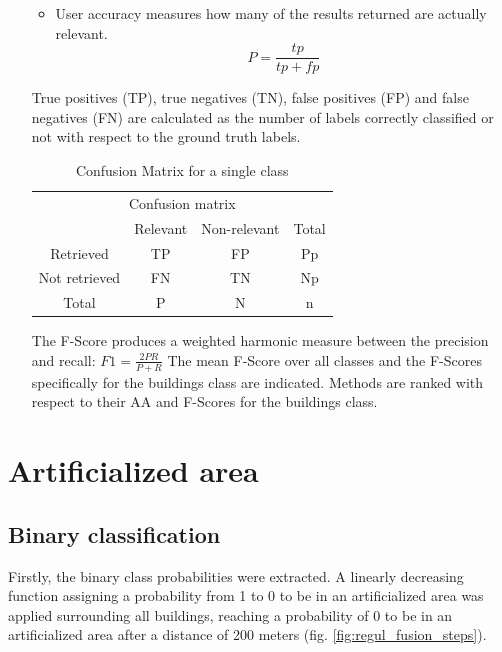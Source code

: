 \documentclass[10pt]{article}
\begin{document}
\begin{itemize}
\begin{itemize}
\begin{equation}
	    \end{equation}
	    \item User accuracy measures how many of the results returned are actually relevant.
	    \begin{equation}
	        P=\frac{tp}{tp+fp}
	    \end{equation}
    \end{itemize}
    True positives (TP), true negatives (TN), false positives (FP) and false negatives (FN) are calculated as the number of labels correctly classified or not with respect to the ground truth labels.
    \begin{table}[H]
        \begin{center}
            \begin{tabular}{c|c c| c}
                \multicolumn{4}{c}{Confusion matrix} \\
                 & Relevant & Non-relevant & Total \\
                \hline
                Retrieved & TP & FP & Pp \\
                Not retrieved & FN & TN & Np \\
                \hline
                Total & P & N & n
            \end{tabular}
            \caption{Confusion Matrix for a single class}
            \label{table:confusion_oneclass}
        \end{center}
    \end{table}
    The F-Score produces a weighted harmonic measure between the precision and recall:
	$F1=\frac{2PR}{P+R}$
    The mean F-Score over all classes and the F-Scores specifically for the buildings class are indicated. Methods are ranked with respect to their AA and F-Scores for the buildings class.
\end{itemize}
\section{Artificialized area}

\subsection{Binary classification}
Firstly, the binary class probabilities were extracted. A linearly decreasing function assigning a probability from 1 to 0 to be in an artificialized area was applied surrounding all buildings, reaching a probability of 0 to be in an artificialized area after a distance of 200 meters (fig. \ref{fig:regul_fusion_steps}).
\end{document}
